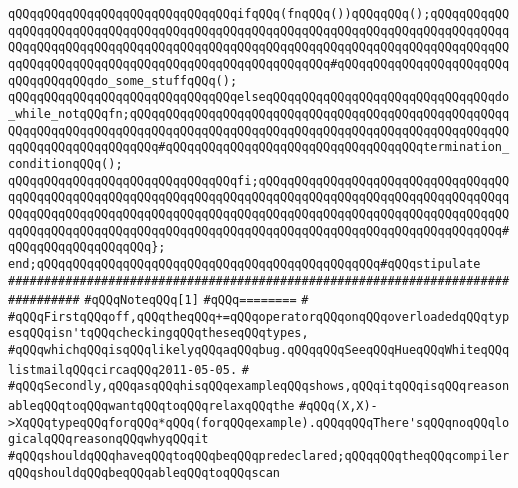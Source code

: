\verb|qQQqqQQqqQQqqQQqqQQqqQQqqQQqqQQqifqQQq(fnqQQq())qQQqqQQq();qQQqqQQqqQQqqQQqqQQqqQQqqQQqqQQqqQQqqQQqqQQqqQQqqQQqqQQqqQQqqQQqqQQqqQQqqQQqqQQqqQQqqQQqqQQqqQQqqQQqqQQqqQQqqQQqqQQqqQQqqQQqqQQqqQQqqQQqqQQqqQQqqQQqqQQqqQQqqQQqqQQqqQQqqQQqqQQqqQQqqQQqqQQqqQQqqQQq#qQQqqQQqqQQqqQQqqQQqqQQqqQQqqQQqqQQqdo_some_stuffqQQq();|\newline
\verb|qQQqqQQqqQQqqQQqqQQqqQQqqQQqqQQqelseqQQqqQQqqQQqqQQqqQQqqQQqqQQqqQQqdo_while_notqQQqfn;qQQqqQQqqQQqqQQqqQQqqQQqqQQqqQQqqQQqqQQqqQQqqQQqqQQqqQQqqQQqqQQqqQQqqQQqqQQqqQQqqQQqqQQqqQQqqQQqqQQqqQQqqQQqqQQqqQQqqQQqqQQqqQQqqQQqqQQqqQQqqQQq#qQQqqQQqqQQqqQQqqQQqqQQqqQQqqQQqqQQqtermination_conditionqQQq();|\newline
\verb|qQQqqQQqqQQqqQQqqQQqqQQqqQQqqQQqfi;qQQqqQQqqQQqqQQqqQQqqQQqqQQqqQQqqQQqqQQqqQQqqQQqqQQqqQQqqQQqqQQqqQQqqQQqqQQqqQQqqQQqqQQqqQQqqQQqqQQqqQQqqQQqqQQqqQQqqQQqqQQqqQQqqQQqqQQqqQQqqQQqqQQqqQQqqQQqqQQqqQQqqQQqqQQqqQQqqQQqqQQqqQQqqQQqqQQqqQQqqQQqqQQqqQQqqQQqqQQqqQQqqQQqqQQqqQQqqQQqqQQq#qQQqqQQqqQQqqQQqqQQq};|\newline
\newline
\verb|end;qQQqqQQqqQQqqQQqqQQqqQQqqQQqqQQqqQQqqQQqqQQqqQQq#qQQqstipulate|\newline
\newline
\newline
\newline
\verb|################################################################################|\newline
\verb|#qQQqNoteqQQq[1]|\newline
\verb|#qQQq========|\newline
\verb|#|\newline
\verb|#qQQqFirstqQQqoff,qQQqtheqQQq+=qQQqoperatorqQQqonqQQqoverloadedqQQqtypesqQQqisn'tqQQqcheckingqQQqtheseqQQqtypes,|\newline
\verb|#qQQqwhichqQQqisqQQqlikelyqQQqaqQQqbug.qQQqqQQqSeeqQQqHueqQQqWhiteqQQqlistmailqQQqcircaqQQq2011-05-05.|\newline
\verb|#|\newline
\verb|#qQQqSecondly,qQQqasqQQqhisqQQqexampleqQQqshows,qQQqitqQQqisqQQqreasonableqQQqtoqQQqwantqQQqtoqQQqrelaxqQQqthe|\newline
\verb|#qQQq(X,X)->XqQQqtypeqQQqforqQQq*qQQq(forqQQqexample).qQQqqQQqThere'sqQQqnoqQQqlogicalqQQqreasonqQQqwhyqQQqit|\newline
\verb|#qQQqshouldqQQqhaveqQQqtoqQQqbeqQQqpredeclared;qQQqqQQqtheqQQqcompilerqQQqshouldqQQqbeqQQqableqQQqtoqQQqscan|\newline

